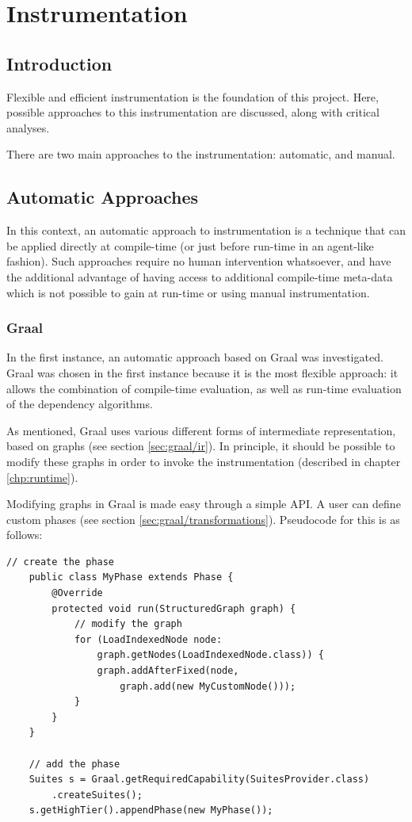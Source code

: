 \chapter{Instrumentation} \label{chp:instrumentation}
\section{Introduction} \label{sec:instrumentation/introduction}
Flexible and efficient instrumentation is the foundation of this project. Here, possible approaches to this instrumentation are discussed, along with critical analyses.

There are two main approaches to the instrumentation: automatic, and manual. 

\section{Automatic Approaches} \label{sec:instrumentation/automatic}
	In this context, an automatic approach to instrumentation is a technique that can be applied directly at compile-time (or just before run-time in an agent-like fashion). Such approaches require no human intervention whatsoever, and have the additional advantage of having access to additional compile-time meta-data which is not possible to gain at run-time or using manual instrumentation.

	\subsection{Graal} \label{sec:instrumentation/graal}
	In the first instance, an automatic approach based on Graal was investigated. Graal was chosen in the first instance because it is the most flexible approach: it allows the combination of compile-time evaluation, as well as run-time evaluation of the dependency algorithms.
	
	As mentioned, Graal uses various different forms of intermediate representation, based on graphs (see section \ref{sec:graal/ir}). In principle, it should be possible to modify these graphs in order to invoke the instrumentation (described in chapter \ref{chp:runtime}).
	
	Modifying graphs in Graal is made easy through a simple API. A user can define custom phases (see section \ref{sec:graal/transformations}). Pseudocode for this is as follows:
	
	\begin{lstlisting}[caption=Sample code for adding a phase and manipulating a graph,label=list:graph-trans]
	// create the phase
	public class MyPhase extends Phase {
	    @Override
	    protected void run(StructuredGraph graph) {
	        // modify the graph
	        for (LoadIndexedNode node:
	            graph.getNodes(LoadIndexedNode.class)) {
	            graph.addAfterFixed(node,
	                graph.add(new MyCustomNode()));
	        }
	    }
	}
	
	// add the phase
	Suites s = Graal.getRequiredCapability(SuitesProvider.class)
	    .createSuites();
	s.getHighTier().appendPhase(new MyPhase());
	\end{lstlisting}
	
